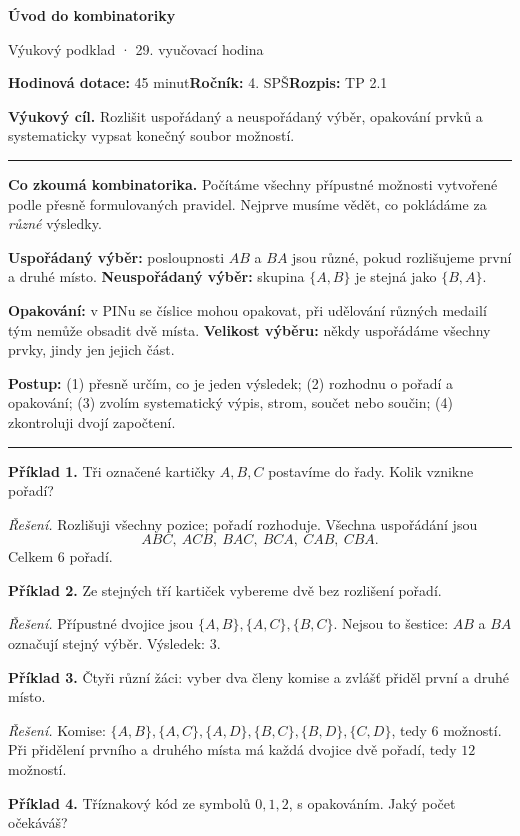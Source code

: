 \documentclass[11pt,a4paper]{article}
\newcommand{\sect}[1]{\par\vspace{2mm}{\Large\sffamily\bfseries\color{deep} #1}\par\vspace{-0.5mm}\noindent\color{teal}\rule{\linewidth}{0.7pt}\color{black}\vspace{1mm}}
\begin{document}
{\Huge\sffamily\bfseries\color{deep} Úvod do kombinatoriky}\par
{\sffamily\large\color{teal} Výukový podklad · 29. vyučovací hodina}\par
\textbf{Hodinová dotace:} 45 minut\quad \textbf{Ročník:} 4. SPŠ\quad \textbf{Rozpis:} TP 2.1\par
\begin{tcolorbox}[theobox]\textbf{Výukový cíl.} Rozlišit uspořádaný a neuspořádaný výběr, opakování prvků a systematicky vypsat konečný soubor možností.\end{tcolorbox}
\sect{Teorie a vysvětlení}
\textbf{Co zkoumá kombinatorika.} Počítáme všechny přípustné možnosti vytvořené podle přesně formulovaných pravidel. Nejprve musíme vědět, co pokládáme za \emph{různé} výsledky.\par
\textbf{Uspořádaný výběr:} posloupnosti \(AB\) a \(BA\) jsou různé, pokud rozlišujeme první a druhé místo. \textbf{Neuspořádaný výběr:} skupina \(\{A,B\}\) je stejná jako \(\{B,A\}\).\par
\textbf{Opakování:} v PINu se číslice mohou opakovat, při udělování různých medailí tým nemůže obsadit dvě místa. \textbf{Velikost výběru:} někdy uspořádáme všechny prvky, jindy jen jejich část.\par
\textbf{Postup:} (1) přesně určím, co je jeden výsledek; (2) rozhodnu o pořadí a opakování; (3) zvolím systematický výpis, strom, součet nebo součin; (4) zkontroluji dvojí započtení.
\sect{Řešené příklady}
\textbf{Příklad 1.} Tři označené kartičky \(A,B,C\) postavíme do řady. Kolik vznikne pořadí?\par
\textit{Řešení.} Rozlišuji všechny pozice; pořadí rozhoduje. Všechna uspořádání jsou \[ABC,\ ACB,\ BAC,\ BCA,\ CAB,\ CBA.\] Celkem \(6\) pořadí.\par\smallskip
\textbf{Příklad 2.} Ze stejných tří kartiček vybereme dvě bez rozlišení pořadí.\par
\textit{Řešení.} Přípustné dvojice jsou \(\{A,B\},\{A,C\},\{B,C\}\). Nejsou to šestice: \(AB\) a \(BA\) označují stejný výběr. Výsledek: \(3\).\par\smallskip
\textbf{Příklad 3.} Čtyři různí žáci: vyber dva členy komise a zvlášť přiděl první a druhé místo.\par
\textit{Řešení.} Komise: \(\{A,B\},\{A,C\},\{A,D\},\{B,C\},\{B,D\},\{C,D\}\), tedy \(6\) možností. Při přidělení prvního a druhého místa má každá dvojice dvě pořadí, tedy \(12\) možností.\par\smallskip
\textbf{Příklad 4.} Tříznakový kód ze symbolů \(0,1,2\), s opakováním. Jaký počet očekáváš?\par
\end{document}

